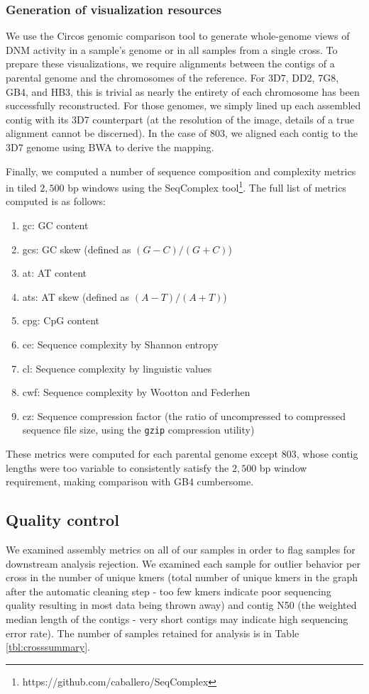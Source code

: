 \subsubsection{Generation of visualization resources}

We use the Circos\cite{Krzywinski:2009ix} genomic comparison tool to generate whole-genome views of DNM activity in a sample's genome or in all samples from a single cross.  To prepare these visualizations, we require alignments between the contigs of a parental genome and the chromosomes of the reference.  For 3D7, DD2, 7G8, GB4, and HB3, this is trivial as nearly the entirety of each chromosome has been successfully reconstructed.  For those genomes, we simply lined up each assembled contig with its 3D7 counterpart (at the resolution of the image, details of a true alignment cannot be discerned).  In the case of 803, we aligned each contig to the 3D7 genome using BWA to derive the mapping.  

Finally, we computed a number of sequence composition and complexity metrics in tiled $2,500$ bp windows using the SeqComplex tool\footnote{https://github.com/caballero/SeqComplex}.  The full list of metrics computed is as follows:

\begin{enumerate}
\item gc: GC content
\item gcs: GC skew (defined as $(G - C)/(G + C)$)
\item at: AT content
\item ats: AT skew (defined as $(A - T)/(A + T)$)
\item cpg: CpG content
\item ce: Sequence complexity by Shannon entropy\cite{Shannon:1948iy}
\item cl: Sequence complexity by linguistic values\cite{Trifonov:1990vu}
\item cwf: Sequence complexity by Wootton and Federhen\cite{Wootton:1996tu}
\item cz: Sequence compression factor (the ratio of uncompressed to compressed sequence file size, using the \texttt{gzip} compression utility)
\end{enumerate}

These metrics were computed for each parental genome except 803, whose contig lengths were too variable to consistently satisfy the $2,500$ bp window requirement, making comparison with GB4 cumbersome.

\subsection{Quality control}
We examined assembly metrics on all of our samples in order to flag samples for downstream analysis rejection.  We examined each sample for outlier behavior per cross in the number of unique kmers (total number of unique kmers in the graph after the automatic cleaning step - too few kmers indicate poor sequencing quality resulting in most data being thrown away) and contig N50 (the weighted median length of the contigs - very short contigs may indicate high sequencing error rate).  The number of samples retained for analysis is in Table \ref{tbl:crosssummary}.

